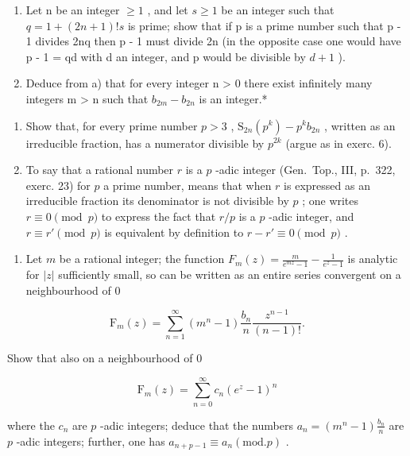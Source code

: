 \begin{enumerate}
\def\labelenumi{\alph{enumi})}
\item
  Let n be an integer \(\geqslant 1\) , and let \(s \geqslant 1\) be an integer such that \(q = 1 + (2n + 1)!s\) is prime; show that if p is a prime number such that p - 1 divides 2nq then p - 1 must divide 2n (in the opposite case one would have p - 1 = qd with d an integer, and p would be divisible by \(d + 1\) ).
\item
  Deduce from a) that for every integer n \textgreater{} 0 there exist infinitely many integers m \textgreater{} n such that \(b_{2m} - b_{2n}\) is an integer.*
\end{enumerate}

\begin{enumerate}
\def\labelenumi{\arabic{enumi})}
\setcounter{enumi}{7}
\item
  Show that, for every prime number \(p > 3\) , \(\mathrm{S}_{2n}(p^k) - p^k b_{2n}\) , written as an irreducible fraction, has a numerator divisible by \(p^{2k}\) (argue as in exerc. 6).
\item
  To say that a rational number \(r\) is a \(p\) -adic integer (Gen.~Top., III, p.~322, exerc. 23) for \(p\) a prime number, means that when \(r\) is expressed as an irreducible fraction its denominator is not divisible by \(p\) ; one writes \(r \equiv 0 \pmod{p}\) to express the fact that \(r/p\) is a \(p\) -adic integer, and \(r \equiv r' \pmod{p}\) is equivalent by definition to \(r - r' \equiv 0 \pmod{p}\) .
\end{enumerate}

\begin{enumerate}
\def\labelenumi{\alph{enumi})}
\tightlist
\item
  Let \(m\) be a rational integer; the function \(F_{m}(z) = \frac{m}{e^{mz} - 1} - \frac{1}{e^{z} - 1}\) is analytic for \(|z|\) sufficiently small, so can be written as an entire series convergent on a neighbourhood of 0
\end{enumerate}

\[
\mathrm{F} _ {m} (z) = \sum_ {n = 1} ^ {\infty} (m ^ {n} - 1) \frac {b _ {n}}{n} \frac {z ^ {n - 1}}{(n - 1) !}.
\]

Show that also on a neighbourhood of 0

\[
\mathrm{F} _ {m} (z) = \sum_ {n = 0} ^ {\infty} c _ {n} (e ^ {z} - 1) ^ {n}
\]

where the \(c_{n}\) are \(p\) -adic integers; deduce that the numbers \(a_{n} = (m^{n} - 1)\frac{b_{n}}{n}\) are \(p\) -adic integers; further, one has \(a_{n + p - 1} \equiv a_{n} (\mathrm{mod.} p)\) .

